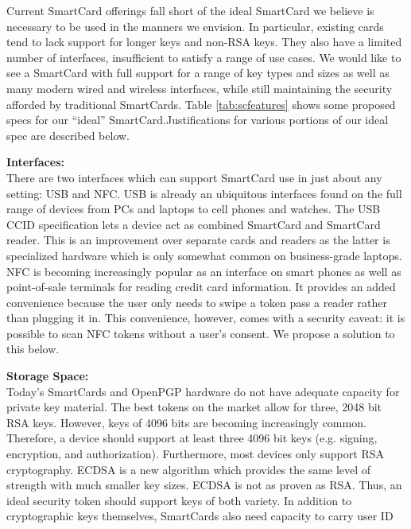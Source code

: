\documentclass[11pt, twocolumn]{article}
\newenvironment{packed_desc}{
\begin{description}
  \setlength{\itemsep}{1pt}
  \setlength{\parskip}{0pt}
  \setlength{\parsep}{0pt}
}{\end{description}}
\begin{document}
Current SmartCard offerings fall short of the ideal SmartCard we
believe is necessary to be used in the manners we envision. In
particular, existing cards tend to lack support for longer keys and
non-RSA keys. They also have a limited number of interfaces,
insufficient to satisfy a range of use cases. We would like to see a
SmartCard with full support for a range of key types and sizes as well
as many modern wired and wireless interfaces, while still maintaining
the security afforded by traditional SmartCards. Table
\ref{tab:scfeatures} shows some proposed specs for our ``ideal''
SmartCard.Justifications for various portions of our ideal spec are
described below.

\begin{packed_desc}
\item{\textbf{Interfaces:}} \\ \hfill There are two interfaces which
  can support SmartCard use in just about any setting: USB and
  NFC. USB is already an ubiquitous interfaces found on the full range
  of devices from PCs and laptops to cell phones and watches. The USB
  CCID specification lets a device act as combined SmartCard and
  SmartCard reader. This is an improvement over separate cards and
  readers as the latter is specialized hardware which is only somewhat
  common on business-grade laptops. NFC is becoming increasingly
  popular as an interface on smart phones as well as point-of-sale
  terminals for reading credit card information. It provides an added
  convenience because the user only needs to swipe a token pass a
  reader rather than plugging it in. This convenience, however, comes
  with a security caveat: it is possible to scan NFC tokens without a
  user's consent. We propose a solution to this below.
\item{\textbf{Storage Space:}} \\ \hfill Today's SmartCards and
  OpenPGP hardware do not have adequate capacity for private key
  material. The best tokens on the market allow for three, 2048 bit
  RSA keys. However, keys of 4096 bits are becoming increasingly
  common. Therefore, a device should support at least three 4096 bit
  keys (e.g. signing, encryption, and authorization). Furthermore,
  most devices only support RSA cryptography. ECDSA is a new algorithm
  which provides the same level of strength with much smaller key
  sizes. ECDSA is not as proven as RSA. Thus, an ideal security token
  should support keys of both variety. In addition to cryptographic
  keys themselves, SmartCards also need capacity to carry user ID

\end{packed_desc}
\end{document}
